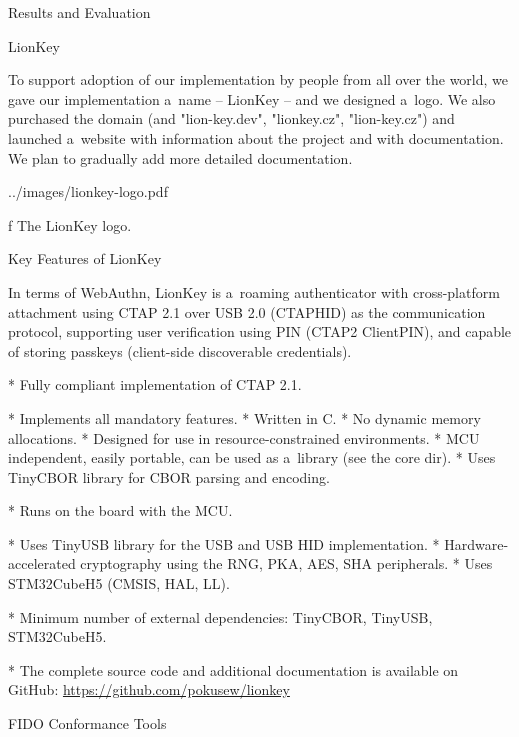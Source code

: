 \chap[evaluation] Results and Evaluation

\sec LionKey

To support adoption of our implementation by people from all over the world, we gave our implementation a~name – LionKey – and we designed a~logo. We also purchased the domain  (and "lion-key.dev", "lionkey.cz", "lion-key.cz") and launched a~website with information about the project and with documentation. We plan to gradually add more detailed documentation.

\midinsert
{}
\picheight=45mm \cinspic ../images/lionkey-logo.pdf
\caption/f The LionKey logo.
\endinsert


\sec Key Features of LionKey

In terms of WebAuthn, LionKey is a~roaming authenticator with cross-platform attachment using CTAP 2.1 over USB 2.0 (CTAPHID) as the communication protocol, supporting user verification using PIN (CTAP2 ClientPIN), and capable of storing passkeys (client-side discoverable credentials).

\begitems

* {\sbf Fully compliant implementation of CTAP 2.1.}

\begitems
* Implements all mandatory features.
* Written in {\sbf C}.
* No dynamic memory allocations.
* Designed for use in resource-constrained environments.
* MCU independent, easily portable, can be used as a~library (see the core dir).
* Uses TinyCBOR library for CBOR parsing and encoding.

\enditems

* Runs on the  board with the  MCU.

\begitems
* Uses TinyUSB library for the USB and USB HID implementation.
* Hardware-accelerated cryptography using the RNG, PKA, AES, SHA peripherals.
* Uses STM32CubeH5 (CMSIS, HAL, LL).
\enditems

* {\sbf Minimum number of external dependencies}: TinyCBOR, TinyUSB, STM32CubeH5.

* The complete source code and additional documentation is available on GitHub:\nl
\url{https://github.com/pokusew/lionkey}

\enditems

\sec FIDO Conformance Tools

